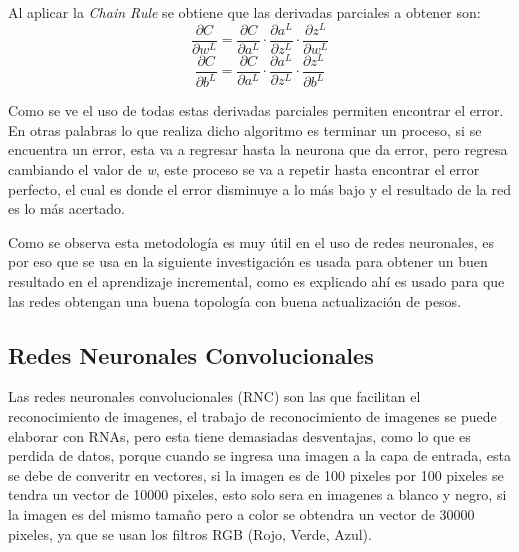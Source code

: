             Al aplicar la \textit{Chain Rule} se obtiene que las derivadas parciales a obtener son:
            \begin{equation*}
                \frac{\partial C}{\partial w^L} = \frac{\partial C}{\partial a^L} \cdot \frac{\partial a^L}{\partial z^L} \cdot \frac{\partial z^L}{\partial w^L} 
            \end{equation*}
            \begin{equation*}
                \frac{\partial C}{\partial b^L} = \frac{\partial C}{\partial a^L} \cdot \frac{\partial a^L}{\partial z^L} \cdot \frac{\partial z^L}{\partial b^L}
            \end{equation*}

            Como se ve el uso de todas estas derivadas parciales permiten encontrar el error.
            En otras palabras lo que realiza dicho algoritmo es terminar un proceso, si se encuentra un error, esta va a regresar
            hasta la neurona que da error, pero regresa cambiando el valor de \textit{w}, este proceso se va a 
            repetir hasta encontrar el error perfecto, el cual es donde el error disminuye a lo m\'as bajo y el resultado
            de la red es lo m\'as acertado.

            Como se observa esta metodolog\'ia es muy \'util en el uso de redes neuronales, es por eso que 
            se usa en la siguiente investigaci\'on \cite{bullinaria2009} es usada para obtener un buen resultado
            en el aprendizaje incremental, como es explicado ah\'i es usado para que las redes obtengan una buena topolog\'ia con 
            buena actualizaci\'on de pesos.

        \subsection{Redes Neuronales Convolucionales}

            Las redes neuronales convolucionales (RNC) son las que facilitan el reconocimiento de imagenes, el trabajo de reconocimiento de
            imagenes se puede elaborar con RNAs, pero esta tiene demasiadas desventajas, como lo que es perdida de datos, porque cuando se 
            ingresa una imagen a la capa de entrada, esta se debe de converitr en vectores, si la imagen es de 100 pixeles por 100 pixeles
            se tendra un vector de 10000 pixeles, esto solo sera en imagenes a blanco y negro, si la imagen es del mismo tamaño pero a color
            se obtendra un vector de 30000 pixeles, ya que se usan los filtros RGB (Rojo, Verde, Azul).

